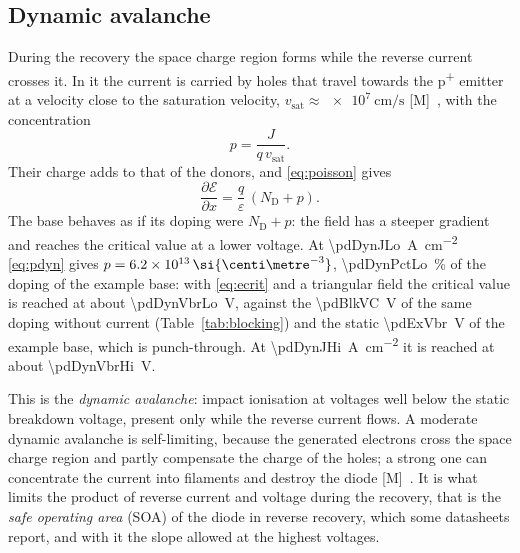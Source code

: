 \documentclass[10pt,a4paper]{scrartcl}
\newcommand{\Ef}{\mathcal{E}}                 %
\newcommand{\ND}{N_\mathrm{D}}
\newcommand{\Pp}{p\textsuperscript{+}}
\newcommand{\cmc}{\si{\centi\metre^{-3}}}
\newcommand{\dpar}[2]{\frac{\partial #1}{\partial #2}}
\begin{document}
\subsection{Dynamic avalanche}
\label{sec:dynaval}
During the recovery the space charge region forms while the reverse current crosses it. In it the current is carried by holes that travel towards the \Pp{} emitter at a velocity close to the saturation velocity, $v_\mathrm{sat} \approx \SI{e7}{\centi\metre\per\second}$ [M]~\cite{sze}, with the concentration
\begin{equation}
p = \frac{J}{q\,v_\mathrm{sat}} .
\label{eq:pdyn}
\end{equation}
Their charge adds to that of the donors, and \eqref{eq:poisson} gives
\begin{equation}
\dpar{\Ef}{x} = \frac{q}{\varepsilon}\,(\ND + p) .
\label{eq:dynfield}
\end{equation}
The base behaves as if its doping were $\ND + p$: the field has a steeper gradient and reaches the critical value at a lower voltage. At \SI{\pdDynJLo}{\ampere\per\centi\metre\squared} \eqref{eq:pdyn} gives $p = \pdDynPLo\,\cmc$, \SI{\pdDynPctLo}{\percent} of the doping of the example base: with \eqref{eq:ecrit} and a triangular field the critical value is reached at about \SI{\pdDynVbrLo}{\volt}, against the \SI{\pdBlkVC}{\volt} of the same doping without current (Table~\ref{tab:blocking}) and the static \SI{\pdExVbr}{\volt} of the example base, which is punch-through. At \SI{\pdDynJHi}{\ampere\per\centi\metre\squared} it is reached at about \SI{\pdDynVbrHi}{\volt}.

This is the \emph{dynamic avalanche}: impact ionisation at voltages well below the static breakdown voltage, present only while the reverse current flows. A moderate dynamic avalanche is self-limiting, because the generated electrons cross the space charge region and partly compensate the charge of the holes; a strong one can concentrate the current into filaments and destroy the diode [M]~\cite{lutz}. It is what limits the product of reverse current and voltage during the recovery, that is the \emph{safe operating area} (SOA) of the diode in reverse recovery, which some datasheets report, and with it the slope allowed at the highest voltages.
\end{document}
